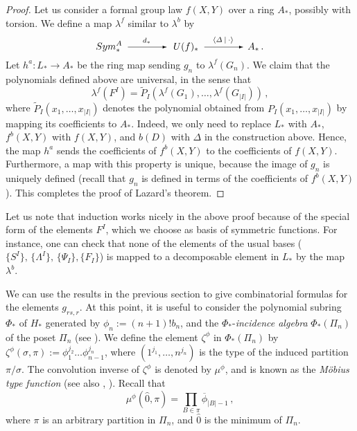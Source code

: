 \documentclass[a4paper,12pt]{amsart}
\theoremstyle{definition}
\numberwithin{equation}{section}
\newcommand{\s}{\sigma}
\newcommand{\arr}{\begin{picture}(45,5) \put(3,2.5){\vector(1,0){40}} \end{picture}}
\newcommand{\arrl}[1]{\stackrel{#1}{\arr}}
\newcommand{\p}{\mbox{$\varPhi_{\ast}$}}
\newcommand{\zp}{\mbox{$\zeta^{\phi}$}}
\newcommand{\mup}{\mbox{$\mu^{\phi}$}}
\newcommand{\z}{\widehat{0}}
\newcommand{\br}[1]{\langle#1\rangle}
\newcommand{\dual}[2]{\br{#1 \:|\: #2}}
\newcommand{\map}[3]{\mbox{$#1 \colon #2 \rightarrow #3$}}
\newcommand{\sua}{Sym_*^A }
\begin{document}
\begin{proof}
Let us consider a formal group law $f(X,Y)$ over a ring $A_*$, possibly with torsion. We define a map $\lambda^f$ similar to $\lambda^b$ by
\[
\sua\arrl{d_*}\:U(f)_*\arrl{\dual{\varDelta}{\cdot}}A_*\,.
\]
Let $\map{h^a}{L_*}{A_*}$ be the ring map sending $g_n$ to $\lambda^f(G_n)$. We claim that the polynomials defined above are universal, in the sense that
\[ \lambda^f(F^I)=\widetilde{P}_I(\lambda^f(G_1),\ldots,\lambda^f(G_{|I|}))\,,\]
where $\widetilde{P}_I(x_1,\ldots,x_{|I|})$ denotes the polynomial obtained from $P_I(x_1,\ldots,x_{|I|})$ by mapping its coefficients to $A_*$. Indeed, we only need to replace $L_*$ with $A_*$, $f^b(X,Y)$ with $f(X,Y)$, and $b(D)$ with $\varDelta$ in the construction above. Hence, the map $h^a$ sends the coefficients of $f^b(X,Y)$ to the coefficients of $f(X,Y)$. Furthermore, a map with this property is unique, because the image of $g_n$ is uniquely defined (recall that $g_n$ is defined in terms of the coefficients of $f^b(X,Y)$). This completes the proof of Lazard's theorem. 
\end{proof}

Let us note that induction works nicely in the above proof because of the special form of the elements $F^I$, which we choose as basis of symmetric functions.  For instance, one can check that none of the elements of the usual bases ($\{S^I\},\, \{\varLambda^I\},\, \{\varPsi_I\}, \{F_I\}$) is mapped to a decomposable element in $L_*$ by the map $\lambda^b$.

We can use the results in the previous section to give combinatorial formulas for the elements $g_{rs,r}$. At this point, it is useful to consider the polynomial subring $\p$ of $H_*$ generated by $\phi_n:=(n+1)!b_n$, and the $\p$-{\em incidence algebra} $\p(\varPi_n)$ of the poset $\varPi_n$ (see \cite{staec}). We define the element $\zp$ in $\p(\varPi_n)$ by $\zp(\s,\pi):=\phi_1^{j_2}\ldots\phi_{n-1}^{j_n}$, where $(1^{j_1},\ldots,n^{j_n})$ is the type of the induced partition $\pi/\s$. The convolution inverse of $\zp$ is denoted by $\mup$, and is known as the {\em M\"{o}bius type function} (see also \cite{rayucb}, \cite{larhas}). Recall that
\[\mu^\phi(\z,\pi)=\prod_{B\in\pi}\overline{\phi}_{|B|-1}\,,\]
where $\pi$ is an arbitrary partition in $\varPi_n$, and $\z$ is the minimum of $\varPi_n$. 
\end{document}
